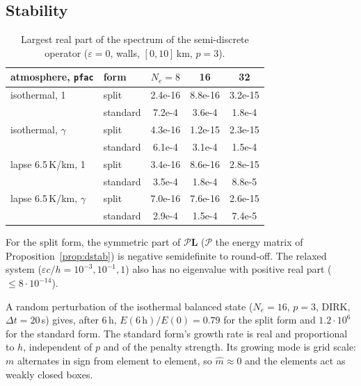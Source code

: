 \documentclass[11pt,a4paper]{article}
\begin{document}
\subsection{Stability}
\begin{table}[h]\centering
\caption{Largest real part of the spectrum of the semi-discrete operator ($\varepsilon=0$, walls,
$[0,10]$\,km, $p=3$).}\label{tab:stab}
\begin{tabular}{llccc}\toprule
atmosphere, \texttt{pfac} & form & $N_e=8$ & 16 & 32\\\midrule
isothermal, 1 & split & 2.4e-16 & 8.8e-16 & 3.2e-15\\
              & standard & 7.2e-4 & 3.6e-4 & 1.8e-4\\
isothermal, $\gamma$ & split & 4.3e-16 & 1.2e-15 & 2.3e-15\\
              & standard & 6.1e-4 & 3.1e-4 & 1.5e-4\\
lapse 6.5\,K/km, 1 & split & 3.4e-16 & 8.6e-16 & 2.8e-15\\
              & standard & 3.5e-4 & 1.8e-4 & 8.8e-5\\
lapse 6.5\,K/km, $\gamma$ & split & 7.0e-16 & 7.6e-16 & 2.6e-15\\
              & standard & 2.9e-4 & 1.5e-4 & 7.4e-5\\\bottomrule
\end{tabular}
\end{table}
For the split form, the symmetric part of $\mathcal P\bm L$ ($\mathcal P$ the energy matrix of
Proposition~\ref{prop:dstab}) is negative semidefinite to round-off. The relaxed system
($\varepsilon c/h=10^{-3},10^{-1},1$) also has no eigenvalue with positive real part
($\le 8\cdot10^{-14}$).

A random perturbation of the isothermal balanced state ($N_e=16$, $p=3$, DIRK, $\Delta t=20$\,s)
gives, after 6\,h, $E(6\,\mathrm h)/E(0)=0.79$ for the split form and $1.2\cdot10^6$ for the
standard form. The standard form's growth rate is real and proportional to $h$, independent of $p$
and of the penalty strength. Its growing mode is grid scale: $m$ alternates in sign from element
to element, so $\hat m\approx0$ and the elements act as weakly closed boxes.
\end{document}
